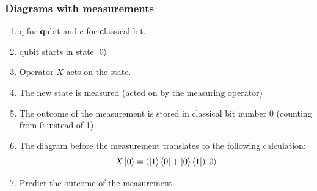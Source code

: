 \documentclass[10pt]{beamer}
\begin{document}
\begin{frame}
  \frametitle{Diagrams with measurements}
  \centerline{
}
\begin{enumerate}
\item<2-> q for \textbf{q}ubit and c for \textbf{c}lassical bit.
\item<3-> qubit starts in state $\ket{0}$
\item<4-> Operator $X$ acts on the state.
\item<5-> The new state is measured (acted on by the measuring operator)
\item<6-> The outcome of the measurement is stored in classical bit number 0 (counting from 0 instead of 1).
\item<7-> The diagram before the measurement translates to the following calculation: $$X \ket{0} = \left(\ket{1}\bra{0} + \ket{0}\bra{1}  \right)\ket{0}$$
\item<8-|alert@8> Predict the outcome of the measurement.
\end{enumerate}
\end{frame}
\end{document}
